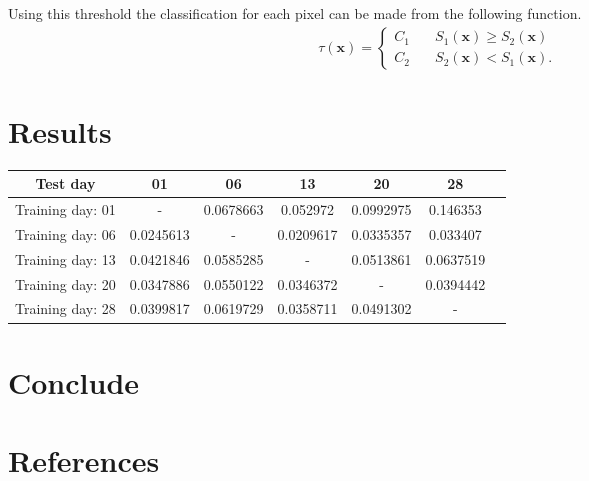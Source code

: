 \documentclass{article}
\begin{document}
Using this threshold the classification for each pixel can be made from the following function.
\begin{align*}
    \tau(\textbf{x})=\begin{cases}
        C_1 \quad & S_1(\textbf{x})\geq S_2(\textbf{x}) \\
        C_2 \quad & S_2(\textbf{x})<S_1(\textbf{x}).
    \end{cases}
\end{align*}
\section{Results}
\begin{tabular}{|c|c|c|c|c|c|c}
\hline
Test day & 01 & 06 & 13 & 20 & 28 \\
\hline
 Training day: 01 & - & 0.0678663 & 0.052972  & 0.0992975 & 0.146353  \\
 Training day: 06 & 0.0245613 & - & 0.0209617 & 0.0335357 & 0.033407  \\
 Training day: 13 & 0.0421846 & 0.0585285 & - & 0.0513861 & 0.0637519 \\
 Training day: 20 & 0.0347886 & 0.0550122 & 0.0346372 & - & 0.0394442 \\
 Training day: 28 & 0.0399817 & 0.0619729 & 0.0358711 & 0.0491302 & - \\
\hline
\end{tabular}
\section{Conclude}


\section{References}
\end{document}

